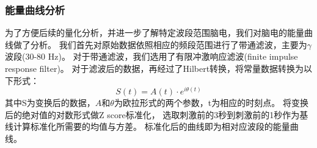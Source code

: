 \subsubsection{能量曲线分析}
为了方便后续的量化分析，并进一步了解特定波段范围脑电，我们对脑电的能量曲线做了分析。
我们首先对原始数据依照相应的频段范围进行了带通滤波，主要为$\gamma$波段(30-80 Hz)。
对于带通滤波，我们选用了有限冲激响应滤波(finite impulse response filter)。
对于滤波后的数据，再经过了Hilbert转换，将常量数据转换为以下形式：
\begin{equation}
    S(t) = A(t) \cdot e^{i \theta(t)}
\end{equation}
其中S为变换后的数据，$A$和$\theta$为欧拉形式的两个参数，t为相应的时刻点。
将变换后的绝对值的对数形式做Z score标准化，
选取刺激前的3秒到刺激前的1秒作为基线计算标准化所需要的均值与方差。
标准化后的曲线即为相对应波段的能量曲线。


%
%
%
%

%

